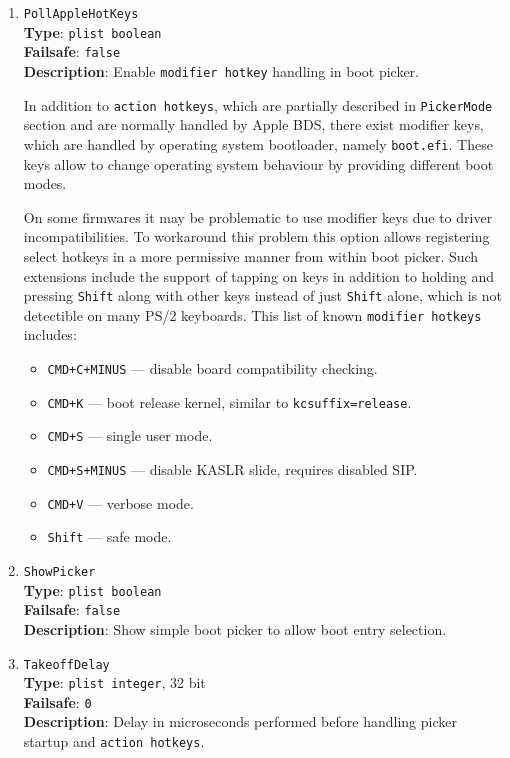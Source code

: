 \documentclass[]{article}
\providecommand{\tightlist}{%
  \setlength{\itemsep}{0pt}\setlength{\parskip}{0pt}}
\begin{document}
\begin{enumerate}
\item
  \texttt{PollAppleHotKeys}\\
  \textbf{Type}: \texttt{plist\ boolean}\\
  \textbf{Failsafe}: \texttt{false}\\
  \textbf{Description}: Enable \texttt{modifier hotkey} handling in boot picker.

  In addition to \texttt{action hotkeys}, which are partially described in \texttt{PickerMode}
  section and are normally handled by Apple BDS, there exist modifier keys, which are
  handled by operating system bootloader, namely \texttt{boot.efi}. These keys
  allow to change operating system behaviour by providing different boot modes.

  On some firmwares it may be problematic to use modifier keys due to driver incompatibilities.
  To workaround this problem this option allows registering select hotkeys in a more
  permissive manner from within boot picker. Such extensions include the support
  of tapping on keys in addition to holding and pressing \texttt{Shift} along with
  other keys instead of just \texttt{Shift} alone, which is not detectible on many
  PS/2 keyboards. This list of known \texttt{modifier hotkeys} includes:
  \begin{itemize}
  \tightlist
  \item \texttt{CMD+C+MINUS} --- disable board compatibility checking.
  \item \texttt{CMD+K} --- boot release kernel, similar to \texttt{kcsuffix=release}.
  \item \texttt{CMD+S} --- single user mode.
  \item \texttt{CMD+S+MINUS} --- disable KASLR slide, requires disabled SIP.
  \item \texttt{CMD+V} --- verbose mode.
  \item \texttt{Shift} --- safe mode.
  \end{itemize}

\item
  \texttt{ShowPicker}\\
  \textbf{Type}: \texttt{plist\ boolean}\\
  \textbf{Failsafe}: \texttt{false}\\
  \textbf{Description}: Show simple boot picker to allow boot entry selection.

\item
  \texttt{TakeoffDelay}\\
  \textbf{Type}: \texttt{plist\ integer}, 32 bit\\
  \textbf{Failsafe}: \texttt{0}\\
  \textbf{Description}: Delay in microseconds performed before handling
  picker startup and \texttt{action hotkeys}.


\end{enumerate}
\end{document}
